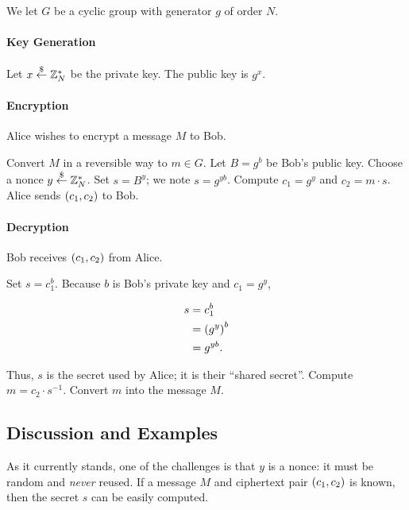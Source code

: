 \begin{defn}
We let $G$ be a \gls{cyclic group} with generator $g$ of order $N$.

\paragraph{Key Generation}
Let $x\stackrel{\$}{\leftarrow}{}\mathbb{Z}_{N}^{*}$ be the private key.
The public key is $g^{x}$.

\paragraph{Encryption}
Alice wishes to encrypt a message $M$ to Bob.

Convert $M$ in a reversible way to $m\in G$.
Let $B = g^{b}$ be Bob's public key.
Choose a \gls{nonce} $y\stackrel{\$}{\leftarrow}{}\mathbb{Z}_{N}^{*}$.
Set $s = B^{y}$; we note $s = g^{yb}$.
Compute $c_{1} = g^{y}$
and $c_{2} = m\cdot s$.
Alice sends $\left( c_{1},c_{2} \right)$ to Bob.

\paragraph{Decryption}
Bob receives $\left( c_{1},c_{2} \right)$ from Alice.

Set $s = c_{1}^{b}$.
Because $b$ is Bob's private key and $c_{1} = g^{y}$,

\begin{align}
    s &= c_{1}^{b} \nonumber\\
        &= \left( g^{y} \right)^{b} \nonumber\\
        &= g^{yb}.
\end{align}

\noindent
Thus, $s$ is the secret used by Alice; it is their ``shared secret''.
Compute $m = c_{2}\cdot s^{-1}$.
Convert $m$ into the message $M$.
\end{defn}

\subsection{Discussion and Examples}

As it currently stands, one of the challenges is that $y$ is a \gls{nonce}:
it must be random and \emph{never} reused.
If a message $M$ and ciphertext pair $\left( c_{1},c_{2} \right)$ is known,
then the secret $s$ can be easily computed.

